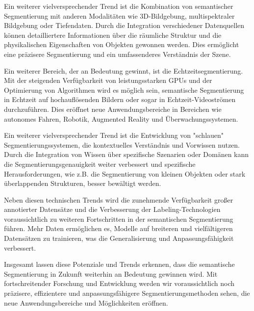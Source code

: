 Ein weiterer vielversprechender Trend ist die Kombination von semantischer
Segmentierung mit anderen Modalitäten wie 3D-Bildgebung, multispektraler
Bildgebung oder Tiefendaten. Durch die Integration verschiedener Datenquellen
können detailliertere Informationen über die räumliche Struktur und die
physikalischen Eigenschaften von Objekten gewonnen werden. Dies ermöglicht eine
präzisere Segmentierung und ein umfassenderes Verständnis der Szene.

Ein weiterer Bereich, der an Bedeutung gewinnt, ist die Echtzeitsegmentierung.
Mit der steigenden Verfügbarkeit von leistungsstarken GPUs und der Optimierung
von Algorithmen wird es möglich sein, semantische Segmentierung in Echtzeit auf
hochauflösenden Bildern oder sogar in Echtzeit-Videoströmen durchzuführen. Dies
eröffnet neue Anwendungsbereiche in Bereichen wie autonomes Fahren, Robotik,
Augmented Reality und Überwachungssystemen.

Ein weiterer vielversprechender Trend ist die Entwicklung von "schlauen"
Segmentierungssystemen, die kontextuelles Verständnis und Vorwissen nutzen.
Durch die Integration von Wissen über spezifische Szenarien oder Domänen kann
die Segmentierungsgenauigkeit weiter verbessert und spezifische
Herausforderungen, wie z.B. die Segmentierung von kleinen Objekten oder stark
überlappenden Strukturen, besser bewältigt werden.

Neben diesen technischen Trends wird die zunehmende Verfügbarkeit großer
annotierter Datensätze und die Verbesserung der Labeling-Technologien
voraussichtlich zu weiteren Fortschritten in der semantischen Segmentierung
führen. Mehr Daten ermöglichen es, Modelle auf breiteren und vielfältigeren
Datensätzen zu trainieren, was die Generalisierung und Anpassungsfähigkeit
verbessert.

Insgesamt lassen diese Potenziale und Trends erkennen, dass die semantische
Segmentierung in Zukunft weiterhin an Bedeutung gewinnen wird. Mit
fortschreitender Forschung und Entwicklung werden wir voraussichtlich noch
präzisere, effizientere und anpassungsfähigere Segmentierungsmethoden sehen,
die neue Anwendungsbereiche und Möglichkeiten eröffnen.